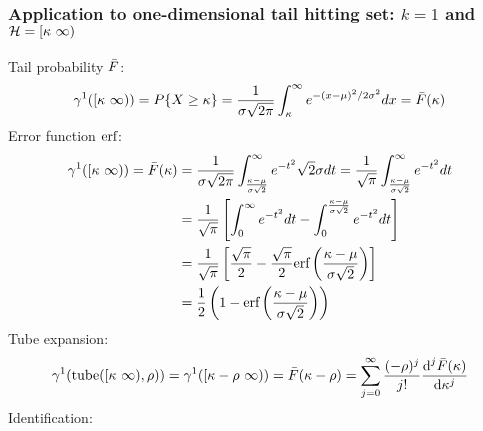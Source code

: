 \documentclass[a4paper,12pt]{article}
\begin{document}
\subsubsection{Application to one-dimensional tail hitting set: $k=1$ and $\mathcal{H}=[\kappa\ \infty)$}
Tail probability $\bar{F}$:
\begin{equation}
  \gamma^1([\kappa\ \infty)) = P\{X\ge\kappa\}=\frac{1}{\sigma\sqrt{2\pi}} \int_\kappa^\infty e^{-(x-\mu)^2/2\sigma^2} dx=\bar{F}(\kappa)
\end{equation}
Error function $\text{erf}$:
\begin{subequations}
  \begin{align*}
    \gamma^1([\kappa\ \infty)) = \bar{F}(\kappa) & = \frac{1}{\sigma\sqrt{2\pi}} \int_{\frac{\kappa-\mu}{\sigma\sqrt{2}}}^\infty e^{-t^2} \sqrt{2}\sigma dt = \frac{1}{\sqrt{\pi}} \int_{\frac{\kappa-\mu}{\sigma\sqrt{2}}}^\infty e^{-t^2} dt \\
                          & = \frac{1}{\sqrt{\pi}} \left[ \int_0^\infty e^{-t^2} dt - \int_0^{\frac{\kappa-\mu}{\sigma\sqrt{2}}} e^{-t^2} dt \right]\\
                          & = \frac{1}{\sqrt{\pi}} \left[ \frac{\sqrt{\pi}}{2} - \frac{\sqrt{\pi}}{2}\text{erf}\left(\frac{\kappa-\mu}{\sigma \sqrt{2}}\right) \right]\\
                          & = \frac{1}{2}\left(1-\text{erf}\left(\frac{\kappa-\mu}{\sigma\sqrt{2}}\right)\right)
  \end{align*}
\end{subequations}
Tube expansion:
\begin{equation}
  \GaussMeas^1(\tube(\uinf,\ray))=\GaussMeas^1([\lset-\ray\ \infty))=\TP(\lset-\ray)=\sum_{j=0}^{\infty} \frac{(-\ray)^j}{j!} \frac{\text{d}^j \TP(\lset)}{\text{d} \lset^j}
\end{equation}
Identification:
\end{document}
